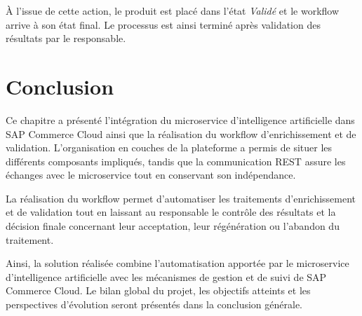 À l'issue de cette action, le produit est placé dans l'état \textit{Validé} et le workflow arrive à son état final. Le processus est ainsi terminé après validation des résultats par le responsable.

\newpage

\section{Conclusion}

Ce chapitre a présenté l'intégration du microservice d'intelligence artificielle dans SAP Commerce Cloud ainsi que la réalisation du workflow d'enrichissement et de validation. L'organisation en couches de la plateforme a permis de situer les différents composants impliqués, tandis que la communication REST assure les échanges avec le microservice tout en conservant son indépendance.

La réalisation du workflow permet d'automatiser les traitements d'enrichissement et de validation tout en laissant au responsable le contrôle des résultats et la décision finale concernant leur acceptation, leur régénération ou l'abandon du traitement.

Ainsi, la solution réalisée combine l'automatisation apportée par le microservice d'intelligence artificielle avec les mécanismes de gestion et de suivi de SAP Commerce Cloud. Le bilan global du projet, les objectifs atteints et les perspectives d'évolution seront présentés dans la conclusion générale.
